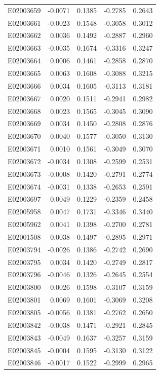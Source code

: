 \documentclass[11pt, a4paper]{article}
\begin{document}
\begin{longtable}{lrrrr}
E02003659 & -0.0071 & 0.1385 & -0.2785 & 0.2643 \\
E02003661 & -0.0023 & 0.1548 & -0.3058 & 0.3012 \\
E02003662 & 0.0036 & 0.1492 & -0.2887 & 0.2960 \\
E02003663 & -0.0035 & 0.1674 & -0.3316 & 0.3247 \\
E02003664 & 0.0006 & 0.1461 & -0.2858 & 0.2870 \\
E02003665 & 0.0063 & 0.1608 & -0.3088 & 0.3215 \\
E02003666 & 0.0034 & 0.1605 & -0.3113 & 0.3181 \\
E02003667 & 0.0020 & 0.1511 & -0.2941 & 0.2982 \\
E02003668 & 0.0023 & 0.1565 & -0.3045 & 0.3090 \\
E02003669 & 0.0034 & 0.1450 & -0.2808 & 0.2876 \\
E02003670 & 0.0040 & 0.1577 & -0.3050 & 0.3130 \\
E02003671 & 0.0010 & 0.1561 & -0.3049 & 0.3070 \\
E02003672 & -0.0034 & 0.1308 & -0.2599 & 0.2531 \\
E02003673 & -0.0008 & 0.1420 & -0.2791 & 0.2774 \\
E02003674 & -0.0031 & 0.1338 & -0.2653 & 0.2591 \\
E02003697 & 0.0049 & 0.1229 & -0.2359 & 0.2458 \\
E02005958 & 0.0047 & 0.1731 & -0.3346 & 0.3440 \\
E02005962 & 0.0041 & 0.1398 & -0.2700 & 0.2781 \\
E02001508 & 0.0038 & 0.1497 & -0.2895 & 0.2971 \\
E02003794 & -0.0026 & 0.1386 & -0.2742 & 0.2690 \\
E02003795 & 0.0034 & 0.1420 & -0.2749 & 0.2817 \\
E02003796 & -0.0046 & 0.1326 & -0.2645 & 0.2554 \\
E02003800 & 0.0026 & 0.1598 & -0.3107 & 0.3159 \\
E02003801 & 0.0069 & 0.1601 & -0.3069 & 0.3208 \\
E02003805 & -0.0056 & 0.1381 & -0.2762 & 0.2650 \\
E02003842 & -0.0038 & 0.1471 & -0.2921 & 0.2845 \\
E02003843 & -0.0049 & 0.1637 & -0.3257 & 0.3159 \\
E02003845 & -0.0004 & 0.1595 & -0.3130 & 0.3122 \\
E02003846 & -0.0017 & 0.1522 & -0.2999 & 0.2965 \\

\end{longtable}
\end{document}
